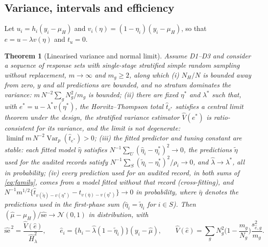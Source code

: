 \documentclass[11pt]{article}
\newtheorem{theorem}{Theorem}
\theoremstyle{definition}
\newcommand{\Var}{\operatorname{Var}}
\newcommand{\muH}{\mu_H}
\begin{document}
\subsection{Variance, intervals and efficiency}\label{sec:variance}
Let $u_i=h_i(y_i-\muH)$ and $v_i(\eta)=(1-\eta_i)(y_i-\muH)$, so that
$e=u-\lambda v(\eta)$ and $t_u=0$.

\begin{theorem}[Linearised variance and normal limit]\label{t:clt}
Assume D1--D3 and consider a sequence of response sets with single-stage stratified simple
random sampling without replacement, $m\to\infty$ and $m_g\ge2$, along which
(i) $N_H/N$ is bounded away from zero, $y$ and all predictions are bounded, and no stratum
dominates the variance: $m\,N^{-2}\sum_gN_g^2/m_g$ is bounded;
(ii) there are fixed $\eta^\ast$ and $\lambda^\ast$ such that, with
$e^\ast=u-\lambda^\ast v(\eta^\ast)$, the Horvitz--Thompson total $\hat t_{e^\ast}$ satisfies
a central limit theorem under the design, the stratified variance estimator
$\hat V(e^\ast)$ is ratio-consistent for its variance, and the limit is not degenerate:
$\liminf m\,N^{-2}\Var_p(\hat t_{e^\ast})>0$;
(iii) the fitted predictor and tuning constant are stable: each fitted model $\hat\eta$
satisfies $N^{-1}\sum_U(\hat\eta_i-\eta^\ast_i)^2\to0$, the predictions $\tilde\eta$ used
for the audited records satisfy $N^{-1}\sum_S(\tilde\eta_i-\eta^\ast_i)^2/\rho_i\to0$, and
$\hat\lambda\to\lambda^\ast$, all in probability;
(iv) every prediction used for an audited record, in both sums of \eqref{eq:family}, comes
from a model fitted without that record (cross-fitting), and
$N^{-1}m^{1/2}\{\hat t_{v(\tilde\eta)-v(\eta^\ast)}-t_{v(\bar\eta)-v(\eta^\ast)}\}\to0$ in
probability, where $\bar\eta$ denotes the predictions used in the first-phase sum
($\bar\eta_i=\tilde\eta_i$ for $i\in S$).
Then $(\hat\mu-\muH)/\widehat{\mathrm{se}}\to\mathcal N(0,1)$ in distribution, with
\begin{equation}\label{eq:se}
\widehat{\mathrm{se}}^{\,2}=\frac{\hat V(\hat e)}{\hat H_\lambda^{2}},
\qquad \hat e_i=\{h_i-\hat\lambda(1-\tilde\eta_i)\}(y_i-\hat\mu),
\qquad \hat V(\hat e)=\sum_g N_g^2\Big(1-\frac{m_g}{N_g}\Big)\frac{s^2_{\hat e,g}}{m_g}.
\end{equation}
\end{theorem}
\end{document}
